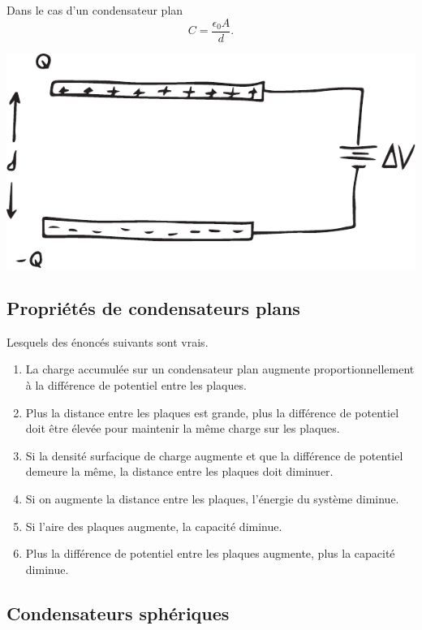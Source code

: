Dans le cas d'un condensateur plan
$$C = \frac{\epsilon_0 A}{d}.$$

\begin{center}
  \includegraphics[scale=0.5]{07-condensateurs/figures/condensateur-plan.pdf}
\end{center}


\subsection*{Propriétés de condensateurs plans}

Lesquels des énoncés suivants sont vrais.

\begin{enumerate}
  \item La charge accumulée sur un condensateur plan augmente
    proportionnellement à la différence de potentiel entre les plaques.
  \item Plus la distance entre les plaques est grande, plus la différence de
    potentiel doit être élevée pour maintenir la même charge sur les plaques.
  \item Si la densité surfacique de charge augmente et que la différence de
    potentiel demeure la même, la distance entre les plaques doit diminuer.
  \item Si on augmente la distance entre les plaques, l'énergie du système
    diminue.
  \item Si l'aire des plaques augmente, la capacité diminue.
  \item Plus la différence de potentiel entre les plaques augmente, plus la
    capacité diminue.
\end{enumerate}



\subsection*{Condensateurs sphériques}

